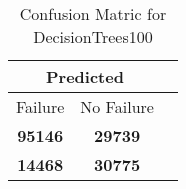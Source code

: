 \begin{table}[] 
\caption{Confusion Matric for DecisionTrees100} 
\label{Table: Prediction Accuracy-DMDDecisionTrees100OnlySunEKF-resetReflection-Reflection} 
\centering 
\begin{tabular} 
 {@{}ccc@{}} 
\toprule 
\multicolumn{2}{c}{\textbf{Predicted}}
 \\ \midrule 
\multicolumn{1}{|c|}{Failure} & 
\multicolumn{1}{c|}{No Failure}
 \\ \midrule 
\multicolumn{1}{|c|}{\color{green}\textbf{95146}} & 
\multicolumn{1}{c|}{\color{red}\textbf{29739}}
 \\ \midrule 
\multicolumn{1}{|c|}{\color{red}\textbf{14468}} & 
\multicolumn{1}{c|}{\color{green}\textbf{30775}}
 \\ \bottomrule 
\end{tabular} 
\end{table} 
